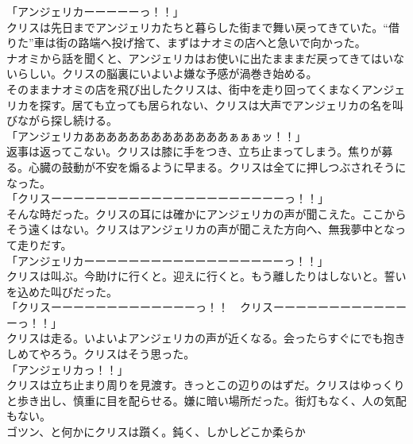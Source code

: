 \documentclass[b5j,10pt,openany]{jsbook}
\begin{document}
「アンジェリカーーーーーっ！！」\\クリスは先日までアンジェリカたちと暮らした街まで舞い戻ってきていた。``借りた''車は街の路端へ投げ捨て、まずはナオミの店へと急いで向かった。\\ナオミから話を聞くと、アンジェリカはお使いに出たまままだ戻ってきてはいないらしい。クリスの脳裏にいよいよ嫌な予感が渦巻き始める。\\そのままナオミの店を飛び出したクリスは、街中を走り回ってくまなくアンジェリカを探す。居ても立っても居られない、クリスは大声でアンジェリカの名を叫びながら探し続ける。\\「アンジェリカあああああああああああああぁぁぁッ！！」\\返事は返ってこない。クリスは膝に手をつき、立ち止まってしまう。焦りが募る。心臓の鼓動が不安を煽るように早まる。クリスは全てに押しつぶされそうになった。\\「クリスーーーーーーーーーーーーーーーーーーーーーっ！！」\\そんな時だった。クリスの耳には確かにアンジェリカの声が聞こえた。ここからそう遠くはない。クリスはアンジェリカの声が聞こえた方向へ、無我夢中となって走りだす。\\「アンジェリカーーーーーーーーーーーーーーーーーーっ！！」\\クリスは叫ぶ。今助けに行くと。迎えに行くと。もう離したりはしないと。誓いを込めた叫びだった。\\「クリスーーーーーーーーーーーーーっ！！　クリスーーーーーーーーーーーーーっ！！」\\クリスは走る。いよいよアンジェリカの声が近くなる。会ったらすぐにでも抱きしめてやろう。クリスはそう思った。\\「アンジェリカっ！！」\\クリスは立ち止まり周りを見渡す。きっとこの辺りのはずだ。クリスはゆっくりと歩き出し、慎重に目を配らせる。嫌に暗い場所だった。街灯もなく、人の気配もない。\\ゴツン、と何かにクリスは躓く。鈍く、しかしどこか柔らか
\end{document}
